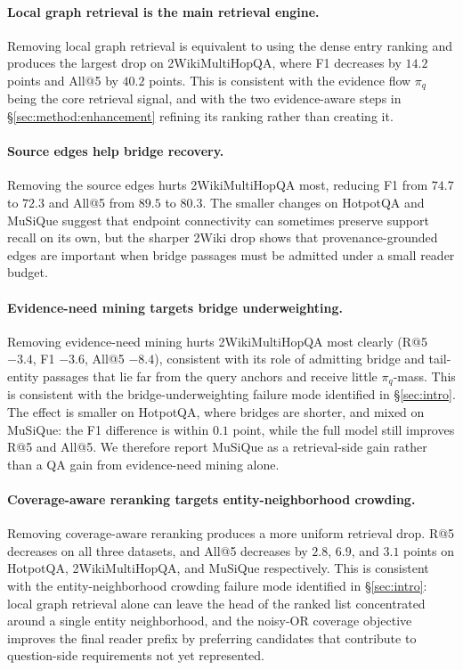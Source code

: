\paragraph{Local graph retrieval is the main retrieval engine.}
Removing local graph retrieval is equivalent to using the dense
entry ranking and produces the largest drop on 2WikiMultiHopQA,
where F1 decreases by $14.2$ points and All@5 by $40.2$ points.
This is consistent with the evidence flow $\pi_q$ being the core
retrieval signal, and with the two evidence-aware steps in
\S\ref{sec:method:enhancement} refining its ranking rather than
creating it.

\paragraph{Source edges help bridge recovery.}
Removing the source edges hurts 2WikiMultiHopQA most, reducing F1
from $74.7$ to $72.3$ and All@5 from $89.5$ to $80.3$. The smaller
changes on HotpotQA and MuSiQue suggest that endpoint connectivity
can sometimes preserve support recall on its own, but the sharper
2Wiki drop shows that provenance-grounded edges are important when
bridge passages must be admitted under a small reader budget.

\paragraph{Evidence-need mining targets bridge underweighting.}
Removing evidence-need mining hurts 2WikiMultiHopQA most clearly
(R@5 $-3.4$, F1 $-3.6$, All@5 $-8.4$), consistent with its role of
admitting bridge and tail-entity passages that lie far from the
query anchors and receive little $\pi_q$-mass. This is consistent
with the bridge-underweighting failure mode identified in
\S\ref{sec:intro}. The effect is smaller on HotpotQA, where bridges
are shorter, and mixed on MuSiQue: the F1 difference is within
$0.1$ point, while the full model still improves R@5 and All@5. We
therefore report MuSiQue as a retrieval-side gain rather than a QA
gain from evidence-need mining alone.

\paragraph{Coverage-aware reranking targets entity-neighborhood crowding.}
Removing coverage-aware reranking produces a more uniform retrieval
drop. R@5 decreases on all three datasets, and All@5 decreases by
$2.8$, $6.9$, and $3.1$ points on HotpotQA, 2WikiMultiHopQA, and
MuSiQue respectively. This is consistent with the
entity-neighborhood crowding failure mode identified in
\S\ref{sec:intro}: local graph retrieval alone can leave the head
of the ranked list concentrated around a single entity
neighborhood, and the noisy-OR coverage objective improves the
final reader prefix by preferring candidates that contribute to
question-side requirements not yet represented.

